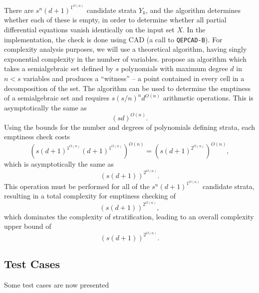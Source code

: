 \documentclass[
]{book}
\theoremstyle{definition}
\theoremstyle{definition}
\theoremstyle{definition}
\theoremstyle{definition}
\theoremstyle{remark}
\begin{document}
There are \(s^{n} (d + 1)^{1^{O(n)}}\) candidate strata \(Y_k\), and the algorithm determines whether each of these is empty, in order to determine whether all partial differential equations vanish identically on the input set \(X\).
In the implementation, the check is done using CAD (a call to \texttt{QEPCAD-B}).
For complexity analysis purposes, we will use a theoretical algorithm, having singly exponential complexity in the number of variables.
\citet{bpr98} propose an algorithm which takes a semialgebraic set defined by \(s\) polynomials with maximum degree \(d\) in \(n < s\) variables and produces a ``witness'' -- a point contained in every cell in a decomposition of the set.
The algorithm can be used to determine the emptiness of a semialgebraic set and requires \(s(s/n)^n d^{O(n)}\) arithmetic operations.
This is asymptotically the same as \[(sd)^{O(n)}.\]
Using the bounds for the number and degrees of polynomials defining strata, each emptiness check costs
\[
\left( s (d+1)^{1^{O(n)}} (d+1)^{1^{O(n)}} \right)^{O(n)}
= \left( s (d+1)^{2^{O(n)}} \right)^{O(n)},
\]
which is asymptotically the same as
\[
\left(s (d+1)\right)^{2^{O(n)}}.
\]
This operation must be performed for all of the
\(s^{n} (d + 1)^{1^{O(n)}}\)
candidate strata, resulting in a total complexity for emptiness checking of
\[
\left(s (d+1)\right)^{2^{O(n)}},
\]
which dominates the complexity of stratification, leading to an overall complexity upper bound of
\[
(s(d+1))^{2^{O(n)}}.
\]

\hypertarget{test-cases}{%
\subsection{Test Cases}\label{test-cases}}

Some test cases are now presented
\end{document}
